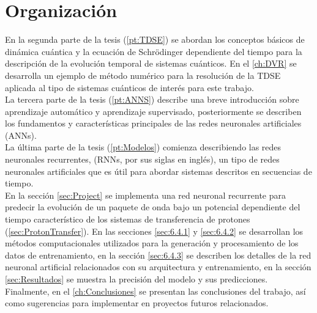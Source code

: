 \section{Organización}

\noindent En la segunda parte de la tesis (\autoref{pt:TDSE}) se abordan los conceptos básicos de dinámica cuántica y la ecuación de Schrödinger dependiente del tiempo para la descripción de la evolución temporal de sistemas cuánticos. En el \autoref{ch:DVR} se desarrolla un ejemplo de método numérico para la resolución de la \acs{TDSE} aplicada al tipo de sistemas cuánticos de interés para este trabajo.\\

La tercera parte de la tesis (\autoref{pt:ANNS}) describe una breve introducción sobre aprendizaje automático y aprendizaje supervisado, posteriormente se describen los fundamentos y características principales de las redes neuronales artificiales (\acs{ANN}s).\\


La última parte de la tesis (\autoref{pt:Modelos}) comienza describiendo las redes neuronales recurrentes, (\acs{RNN}s, por sus siglas en inglés), un tipo de redes neuronales artificiales que es útil para abordar sistemas descritos en secuencias de tiempo.\\
En la sección \autoref{sec:Project} se implementa una red neuronal recurrente para predecir la evolución de un paquete de onda bajo un potencial dependiente del tiempo característico de los sistemas de transferencia de protones (\autoref{sec:ProtonTransfer}). En las secciones \autoref{sec:6.4.1} y \autoref{sec:6.4.2} se desarrollan los métodos computacionales utilizados para la generación y procesamiento de los datos de entrenamiento, en la sección \autoref{sec:6.4.3} se describen los detalles de la red neuronal artificial relacionados con su arquitectura y entrenamiento, en la sección \autoref{sec:Resultados} se muestra la precisión del modelo y sus predicciones. Finalmente, en el \autoref{ch:Conclusiones} se presentan las conclusiones del trabajo, así como sugerencias para implementar en proyectos futuros relacionados.






